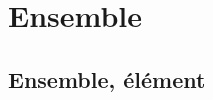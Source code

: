 \documentclass{magnoliaold}
\begin{document}












\section{Ensemble}
\subsection{Ensemble, élément}
\end{document}
